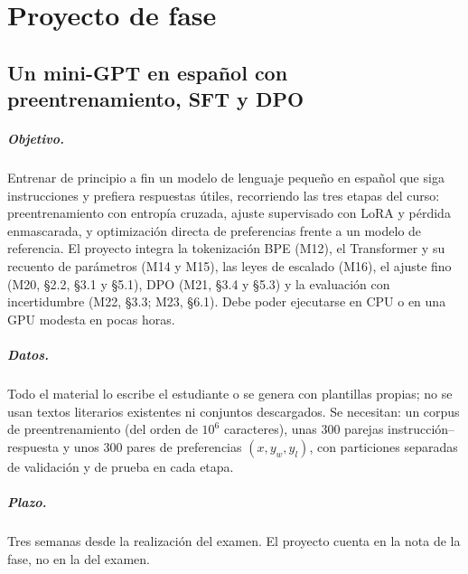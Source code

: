 \chapter{Proyecto de fase}
\label{cap:proyecto}

\section*{Un mini-GPT en español con preentrenamiento, SFT y DPO}

\paragraph{Objetivo.} Entrenar de principio a fin un modelo de lenguaje pequeño en español que siga instrucciones y prefiera respuestas útiles, recorriendo las tres etapas del curso: preentrenamiento con entropía cruzada, ajuste supervisado con LoRA y pérdida enmascarada, y optimización directa de preferencias frente a un modelo de referencia. El proyecto integra la tokenización BPE (M12), el Transformer y su recuento de parámetros (M14 y M15), las leyes de escalado (M16), el ajuste fino (M20, §2.2, §3.1 y §5.1), DPO (M21, §3.4 y §5.3) y la evaluación con incertidumbre (M22, §3.3; M23, §6.1). Debe poder ejecutarse en CPU o en una GPU modesta en pocas horas.

\paragraph{Datos.} Todo el material lo escribe el estudiante o se genera con plantillas propias; no se usan textos literarios existentes ni conjuntos descargados. Se necesitan: un corpus de preentrenamiento (del orden de $10^{6}$ caracteres), unas 300 parejas instrucción--respuesta y unos 300 pares de preferencias $(x,y_w,y_l)$, con particiones separadas de validación y de prueba en cada etapa.

\paragraph{Plazo.} Tres semanas desde la realización del examen. El proyecto cuenta en la nota de la fase, no en la del examen.

